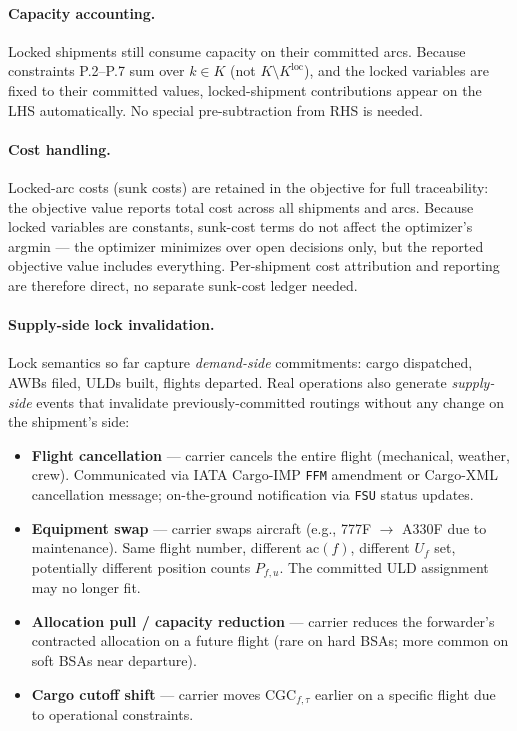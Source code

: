 \documentclass[11pt,a4paper]{article}
\theoremstyle{definition}
\begin{document}
\paragraph{Capacity accounting.}
Locked shipments still consume capacity on their committed arcs. Because constraints
P.2--P.7 sum over $k \in K$ (not $K \setminus K^{\text{loc}}$), and the locked
variables are fixed to their committed values, locked-shipment contributions appear
on the LHS automatically. No special pre-subtraction from RHS is needed.

\paragraph{Cost handling.}
Locked-arc costs (sunk costs) are retained in the objective for full traceability:
the objective value reports total cost across all shipments and arcs. Because locked
variables are constants, sunk-cost terms do not affect the optimizer's argmin --- the
optimizer minimizes over open decisions only, but the reported objective value
includes everything. Per-shipment cost attribution and reporting are therefore
direct, no separate sunk-cost ledger needed.

\paragraph{Supply-side lock invalidation.}
Lock semantics so far capture \emph{demand-side} commitments: cargo dispatched, AWBs
filed, ULDs built, flights departed. Real operations also generate \emph{supply-side}
events that invalidate previously-committed routings without any change on the
shipment's side:
\begin{itemize}[noitemsep]
  \item \textbf{Flight cancellation} --- carrier cancels the entire flight (mechanical,
        weather, crew). Communicated via IATA Cargo-IMP \texttt{FFM}
        amendment or Cargo-XML cancellation message; on-the-ground
        notification via \texttt{FSU} status updates.
  \item \textbf{Equipment swap} --- carrier swaps aircraft (e.g., 777F $\to$ A330F due to
        maintenance). Same flight number, different $\text{ac}(f)$, different
        $U_f$ set, potentially different position counts $P_{f,u}$. The committed ULD
        assignment may no longer fit.
  \item \textbf{Allocation pull / capacity reduction} --- carrier reduces the
        forwarder's contracted allocation on a future flight (rare on hard BSAs;
        more common on soft BSAs near departure).
  \item \textbf{Cargo cutoff shift} --- carrier moves $\text{CGC}_{f,\tau}$ earlier
        on a specific flight due to operational constraints.
\end{itemize}
\end{document}
